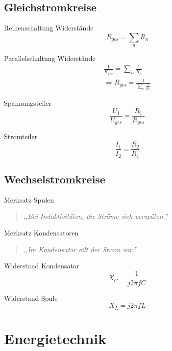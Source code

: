 \documentclass[11pt, a4paper, draft, fleqn, twocolumn]{article}
\numberwithin{equation}{subsection}
\begin{document}
\subsection{Gleichstromkreise}

Reihenschaltung Widerstände
\begin{equation}
    R_{ges} = \sum_n R_n
\end{equation}

\noindent Parallelschaltung Widerstände
\begin{equation}
\begin{split}
    \frac{1}{R_{ges}} = \sum_n \frac{1}{R_n} \\
    \Rightarrow R_{ges} = \frac{1}{\sum_n \frac{1}{R_n}}
\end{split}
\end{equation}

\noindent Spannungsteiler
\begin{equation}
    \frac{U_1}{U_{ges}} = \frac{R_1}{R_{ges}}
\end{equation}

\noindent Stromteiler
\begin{equation}
    \frac{I_1}{I_2} = \frac{R_2}{R_1}
\end{equation}


\subsection{Wechselstromkreise}

Merksatz Spulen
\begin{quote}
    \textit{,,Bei Induktivitäten, die Ströme sich verspäten.''}
\end{quote}

\noindent Merksatz Kondensatoren
\begin{quote}
    \textit{,,Im Kondensator eilt der Strom vor.''}
\end{quote}

\noindent Widerstand Kondensator
\begin{equation}
    X_C = \frac{1}{j 2\pi f C}
\end{equation}

\noindent Widerstand Spule
\begin{equation}
    X_L = j 2\pi f L
\end{equation}



\section{Energietechnik}
\end{document}
